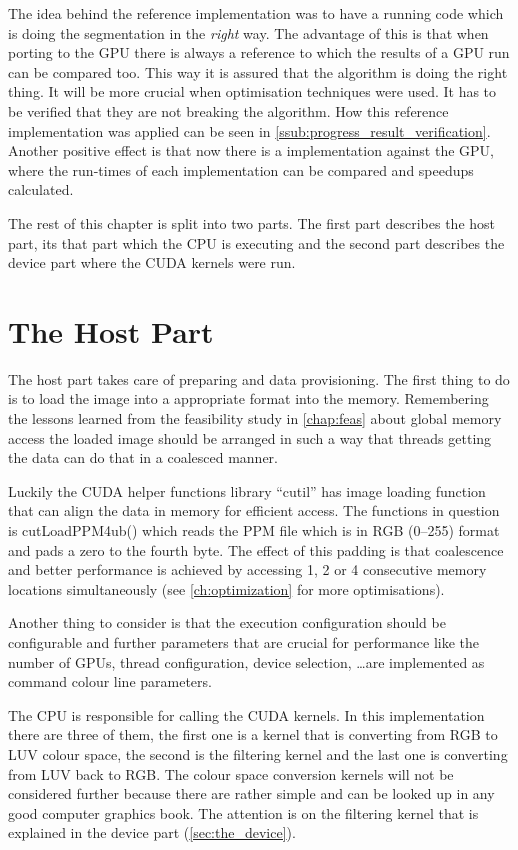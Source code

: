The idea behind the reference implementation was to have a running code which is
doing the segmentation in the \emph{right} way. The advantage of this is that
when porting to the \gls{GPU} there is always a reference to which the results
of a \gls{GPU} run can be compared too. This way it is assured that the
algorithm is doing the right thing. It will be more crucial when optimisation
techniques were used. It has to be verified that they are not breaking the
algorithm. How this reference implementation was applied can be seen in 
\autoref{ssub:progress_result_verification}. Another positive effect is that now
there is a implementation against the \gls{GPU}, where the run-times of each
implementation can be compared and speedups calculated. 

The rest of this chapter is split into two parts. The first part describes
the host part, its that part which the \gls{CPU} is executing and the second
part describes the device part where the \gls{CUDA} kernels were run. 


\section{The Host Part} %
\label{sec:the_host}
The host part takes care of preparing and data provisioning. The first thing
to do is to load the image into a appropriate format into the memory. Remembering
the lessons learned from the feasibility study in \autoref{chap:feas} about
global memory access the loaded image should be arranged in such a way that
threads getting the data can do that in a coalesced manner. 

Luckily the \gls{CUDA} helper functions library ``cutil'' has image loading
function that can align the data in memory for efficient access. The functions
in question is \textsf{cutLoadPPM4ub()} which reads the \gls{PPM} file which is
in \gls{RGB} (0--255) format and pads a zero to the fourth byte. The effect of
this padding is that coalescence and better performance is achieved by accessing
1, 2 or 4 consecutive memory locations simultaneously (see \autoref{ch:optimization}
for more optimisations).

Another thing to consider is that the execution configuration should be configurable
and further parameters that are crucial for performance like the number of 
\glspl{GPU}, thread configuration, device selection, \ldots are implemented as 
command colour line parameters. 

The \gls{CPU} is responsible for calling the \gls{CUDA} kernels. In this 
implementation there are three of them, the first one is a kernel that is
converting from \gls{RGB} to \gls{LUV} colour space, the second is the filtering kernel
and the last one is converting from \gls{LUV} back to \gls{RGB}. The colour space
conversion kernels will not be considered further because there are rather simple
and can be looked up in any good computer graphics book. The attention is on 
the filtering kernel that is explained in the device part (\autoref{sec:the_device}).

